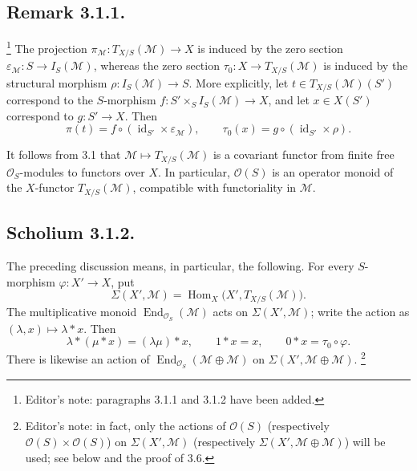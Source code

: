 \subsection*{Remark 3.1.1.}
\footnote{Editor's note: paragraphs 3.1.1 and 3.1.2 have been added.}
The projection
\(\pi_{\mathcal M}:T_{X/S}(\mathcal M)\to X\) is induced by the zero
section \(\varepsilon_{\mathcal M}:S\to I_S(\mathcal M)\), whereas the
zero section \(\tau_0:X\to T_{X/S}(\mathcal M)\) is induced by the
structural morphism \(\rho:I_S(\mathcal M)\to S\). More explicitly, let
\(t\in T_{X/S}(\mathcal M)(S')\) correspond to the \(S\)-morphism
\(f:S'\times_S I_S(\mathcal M)\to X\), and let \(x\in X(S')\)
correspond to \(g:S'\to X\). Then
\[
  \pi(t)=f\circ(\operatorname{id}_{S'}\times\varepsilon_{\mathcal M}),
  \qquad
  \tau_0(x)=g\circ(\operatorname{id}_{S'}\times\rho).
\]

It follows from 3.1 that \(\mathcal M\mapsto T_{X/S}(\mathcal M)\) is a
covariant functor from finite free \(\mathcal O_S\)-modules to functors
over \(X\). In particular, \(\mathcal O(S)\) is an operator monoid of the
\(X\)-functor \(T_{X/S}(\mathcal M)\), compatible with functoriality in
\(\mathcal M\).

\subsection*{Scholium 3.1.2.}
\footnotemark[15]
The preceding discussion means, in particular, the following. For every
\(S\)-morphism \(\varphi:X'\to X\), put
\[
  \Sigma(X',\mathcal M)
  =\operatorname{Hom}_X\bigl(X',T_{X/S}(\mathcal M)\bigr).
\]
The multiplicative monoid
\(\operatorname{End}_{\mathcal O_S}(\mathcal M)\) acts on
\(\Sigma(X',\mathcal M)\); write the action as
\((\lambda,x)\mapsto\lambda*x\). Then
\[
  \lambda*(\mu*x)=(\lambda\mu)*x,\qquad
  1*x=x,\qquad 0*x=\tau_0\circ\varphi.
\]
There is likewise an action of
\(\operatorname{End}_{\mathcal O_S}(\mathcal M\oplus\mathcal M)\) on
\(\Sigma(X',\mathcal M\oplus\mathcal M)\).
\footnote{Editor's note: in fact, only the actions of \(\mathcal O(S)\)
(respectively \(\mathcal O(S)\times\mathcal O(S)\)) on
\(\Sigma(X',\mathcal M)\) (respectively
\(\Sigma(X',\mathcal M\oplus\mathcal M)\)) will be used; see below and
the proof of 3.6.}

